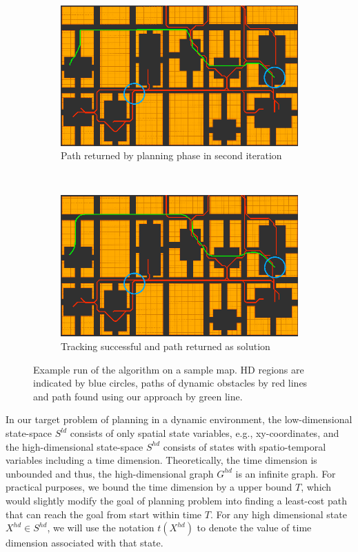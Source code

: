 \begin{figure}[ht]
  \begin{subfigure}[t]{0.45\linewidth}
    \centering
    \includegraphics[width=\linewidth]{Figures/alg5_c.png}
    \caption{Path returned by planning phase in second iteration}
  \end{subfigure}
  ~
  \begin{subfigure}[t]{0.45\linewidth}
    \centering
    \includegraphics[width=\linewidth]{Figures/alg6_c.png}
    \caption{Tracking successful and path returned as solution}
  \end{subfigure}

  \caption{Example run of the algorithm on a sample map. HD regions are indicated by blue circles, paths of dynamic obstacles by red lines and path found using our approach by green line.}
  \label{fig:ppad-alg}
\end{figure}

In our target problem of planning in a dynamic environment,
the low-dimensional state-space $S^{ld}$ consists of only spatial state variables, e.g., xy-coordinates, and the high-dimensional state-space $S^{hd}$ consists of states with spatio-temporal variables including a time dimension. Theoretically, the time dimension is unbounded and thus, the high-dimensional graph $G^{hd}$ is an infinite graph. For practical purposes, we bound the time dimension by a upper bound $T$, which would slightly modify the goal of planning problem into finding a least-cost path that can reach the goal from start within time $T$.
For any high dimensional state $X^{hd} \in S^{hd}$, we will use the notation $t(X^{hd})$ to denote the value of time dimension associated with that state. 

